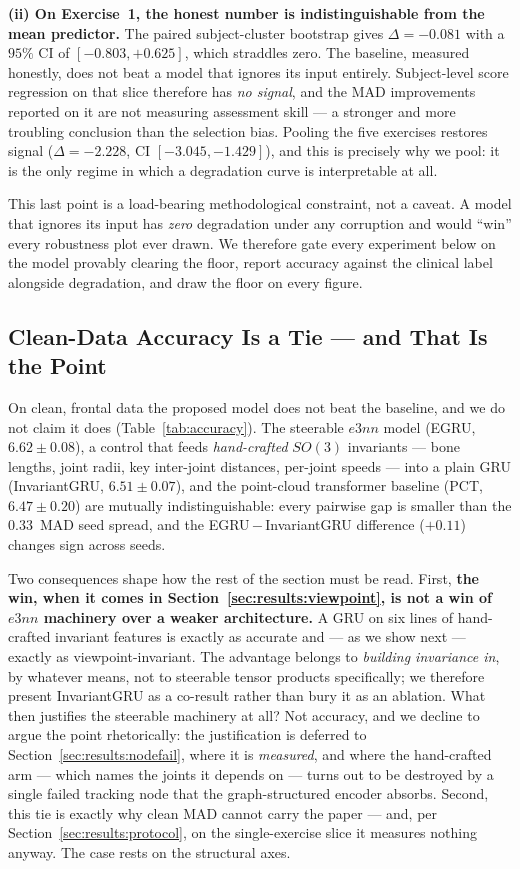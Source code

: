 \documentclass[10pt,journal]{IEEEtran}
\begin{document}
\textbf{(ii) On Exercise~1, the honest number is indistinguishable from the mean predictor.} The
paired subject-cluster bootstrap gives $\Delta=-0.081$ with a $95\%$ CI of $[-0.803,+0.625]$, which
straddles zero. The baseline, measured honestly, does not beat a model that ignores its input
entirely. Subject-level score regression on that slice therefore has \emph{no signal}, and the MAD
improvements reported on it are not measuring assessment skill --- a stronger and more troubling
conclusion than the selection bias. Pooling the five exercises restores signal
($\Delta=-2.228$, CI $[-3.045,-1.429]$), and this is precisely why we pool: it is the only regime
in which a degradation curve is interpretable at all.

This last point is a load-bearing methodological constraint, not a caveat. A model that ignores its
input has \emph{zero} degradation under any corruption and would ``win'' every robustness plot ever
drawn. We therefore gate every experiment below on the model provably clearing the floor, report
accuracy against the clinical label alongside degradation, and draw the floor on every figure.

\subsection{Clean-Data Accuracy Is a Tie --- and That Is the Point}
\label{sec:results:accuracy}

On clean, frontal data the proposed model does not beat the baseline, and we do not claim it does
(Table~\ref{tab:accuracy}). The steerable $e3nn$ model (EGRU, $6.62\pm0.08$), a control that feeds
\emph{hand-crafted} $SO(3)$ invariants --- bone lengths, joint radii, key inter-joint distances,
per-joint speeds --- into a plain GRU (InvariantGRU, $6.51\pm0.07$), and the point-cloud transformer
baseline (PCT, $6.47\pm0.20$) are mutually indistinguishable: every pairwise gap is smaller than the
$0.33$~MAD seed spread, and the EGRU\,$-$\,InvariantGRU difference ($+0.11$) changes sign across
seeds.

Two consequences shape how the rest of the section must be read. First, \textbf{the win, when it
comes in Section~\ref{sec:results:viewpoint}, is not a win of $e3nn$ machinery over a weaker
architecture.} A GRU on six lines of hand-crafted invariant features is exactly as accurate and ---
as we show next --- exactly as viewpoint-invariant. The advantage belongs to \emph{building
invariance in}, by whatever means, not to steerable tensor products specifically; we therefore
present InvariantGRU as a co-result rather than bury it as an ablation. What then justifies the
steerable machinery at all? Not accuracy, and we decline to argue the point rhetorically: the
justification is deferred to Section~\ref{sec:results:nodefail}, where it is \emph{measured}, and
where the hand-crafted arm --- which names the joints it depends on --- turns out to be destroyed by
a single failed tracking node that the graph-structured encoder absorbs. Second, this tie is exactly
why clean MAD cannot carry the paper --- and, per Section~\ref{sec:results:protocol}, on the
single-exercise slice it measures nothing anyway. The case rests on the structural axes.
\end{document}
